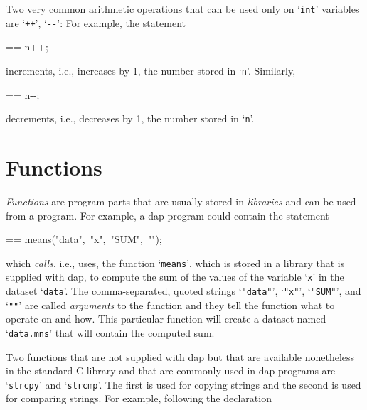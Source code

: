 \documentclass{book}
\makeatletter
\newenvironment{Texinfopreformatted}{%
  \par\GNUTobeylines\obeyspaces\frenchspacing\parskip=\z@\parindent=\z@}{}
{\catcode`\^^M=13 \gdef\GNUTobeylines{\catcode`\^^M=13 \def^^M{\null\par}}}
\newenvironment{Texinfoindented}{\begin{list}{}{}\item\relax}{\end{list}}
\renewcommand{\_}{\Texinfounderscore\discretionary{}{}{}}
\makeatother
\begin{document}
Two very common arithmetic
operations that can be used only on `\texttt{int}' variables
are `\texttt{++}', `\texttt{{-}{-}}':  For example, the statement

\begin{Texinfoindented}
\begin{Texinfopreformatted}%
\ttfamily n++;
\end{Texinfopreformatted}
\end{Texinfoindented}
\noindent{}increments, i.e., increases by 1, the number stored in `\texttt{n}'.
Similarly,

\begin{Texinfoindented}
\begin{Texinfopreformatted}%
\ttfamily n{-}{-};
\end{Texinfopreformatted}
\end{Texinfoindented}
\noindent{}decrements, i.e., decreases by 1, the number stored in `\texttt{n}'.

\section{{Functions}}
\label{anchor:Functions}%

\textsl{Functions} are program parts that are usually stored in \textsl{libraries}
and can be used from a program.  For example, a dap program could contain
the statement

\begin{Texinfoindented}
\begin{Texinfopreformatted}%
\ttfamily means("data",\ "x",\ "SUM",\ "");
\end{Texinfopreformatted}
\end{Texinfoindented}
\noindent{}which \textsl{calls}, i.e., uses,
the function `\texttt{means}', which is stored in a library
that is supplied with dap, to compute the sum of the values of the
variable `\texttt{x}' in the dataset `\texttt{data}'.  The comma-separated,
quoted strings `\texttt{"data"}', `\texttt{"x"}', `\texttt{"SUM"}', and `\texttt{""}'
are called \textsl{arguments} to the function and they tell the function
what to operate on and how.  This particular function will create
a dataset named `\texttt{data.mns}' that will contain the computed sum.

Two functions that are not supplied with dap but that are available
nonetheless in the standard C library and that are commonly used in dap programs are
`\texttt{strcpy}'
%
%
%
and `\texttt{strcmp}'.  The first is used for copying strings and
the second is used for comparing strings.
For example, following the declaration
\end{document}
